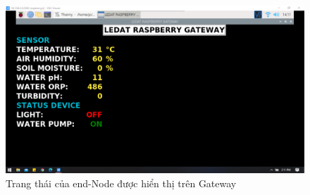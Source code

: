 \begin{figure}[H]
	\centering
	\includegraphics[scale=0.3]{Chapter 4/image chapter 4/Relay1OFF-Relay2ON.png}
	\caption[Trang thái của end-Node được hiển thị trên Gateway]{Trang thái của end-Node được hiển thị trên Gateway}
	\label{hinh410}
\end{figure}